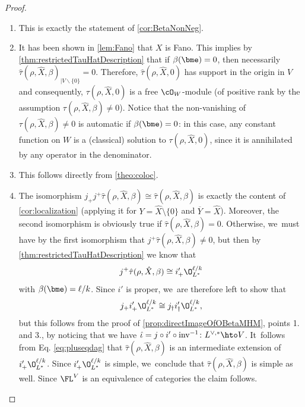 \skpt
\begin{proof}
\begin{enumerate}
\item
This is exactly the statement of \cref{cor:BetaNonNeg}.

\item
It has been shown in \cref{lem:Fano} that $X$ is Fano. This implies by \cref{thm:restrictedTauHatDescription} that if $\beta(\bme)=0$, then necessarily $\hat{\tau}(\rho,\hat{X},\beta)_{|V\backslash\{0\}}=0$. Therefore, $\hat{\tau}(\rho,\hat{X},0)$ has support in the origin in $V$ and consequently, $\tau(\rho,\hat{X},0)$ is a free $\cO_W$\nobreakdash-mod\-ule (of positive rank by the assumption $\tau(\rho,\hat{X},\beta)\!\neq\! 0$). Notice that the non-vanishing of \hbox{$\tau(\rho,\hat{X},\beta)\!\neq\! 0$} is automatic if $\beta(\bme)=0$: in this case, any constant function on $W$ is a (classical) solution to $\tau(\rho,\hat{X},0)$, since it is annihilated by any operator in the denominator.
\item
This follows directly from \cref{theo:coloc}.
\item
The isomorphism
$j_+ j^+ \hat{\tau}(\rho, \hat{X}, \beta) \cong \hat{\tau}(\rho, \hat{X}, \beta)$ is exactly the content of \cref{cor:localization} (applying it for $Y=\hat{X}\setminus \{0\}$ and $\overline{Y}=\hat{X}$). Moreover, the second isomorphism is obviously true if $\hat{\tau}(\rho, \hat{X}, \beta)=0$. Otherwise, we~must have by the first isomorphism that
$j^+\hat{\tau}(\rho, \hat{X}, \beta)\neq 0$, but then by
\cref{thm:restrictedTauHatDescription} we know that
\[
j^+\hat{\tau}(\rho, \hat{X}, \beta) \cong
i'_+ \O_{L^*}^{\ell/k}
\]
with $\beta(\bme)=\ell/k$. Since $i'$ is proper, we~are therefore left to show that
\begin{equation}\label{eq:pluseqdag}
j_+ i'_+ \O_{L^*}^{\ell/k} \cong j_\dag i'_\dag \O_{L^*}^{\ell/k},
\end{equation}
but this follows from the proof of \cref{prop:directImageOfOBetaMHM}, points 1. and 3., by noticing that we have $\hat{\iota}=j\circ i' \circ \textup{inv}^{-1} \colon L^{\vee,*}\hto V$. It~follows from Eq. \eqref{eq:pluseqdag} that $\hat{\tau}(\rho, \hat{X}, \beta)$ is an intermediate extension of $i'_+ \O_{L^*}^{\ell/k}$. Since $ i'_+ \O_{L^*}^{\ell/k}$ is simple, we~conclude that $\hat{\tau}(\rho, \hat{X}, \beta)$ is simple as well. Since $\FL^V$ is an equivalence of categories the claim follows.\qedhere
\end{enumerate}
\end{proof}

